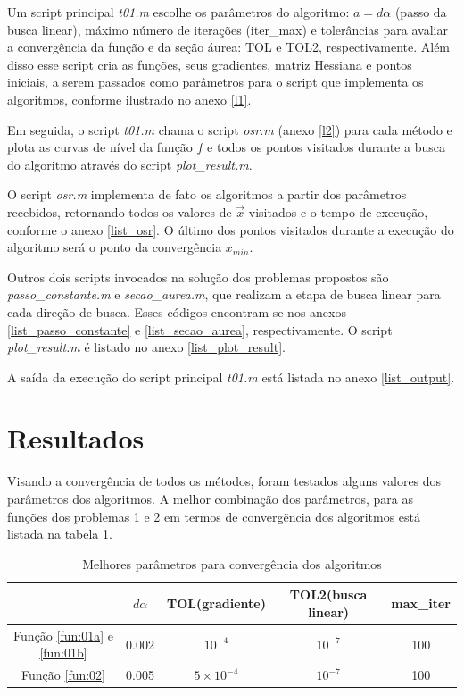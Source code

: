 \documentclass[10pt, a4paper]{article}
\begin{document}
Um script principal \textit{t01.m} escolhe os par\^ametros do algoritmo: $a=d\alpha$ (passo da busca linear), m\'aximo n\'umero de itera\c c\~oes (iter\_max) e toler\^ancias para avaliar a converg\^encia da fun\c c\~ao e da se\c c\~ao \'aurea: TOL e TOL2, respectivamente. Al\'em disso esse script cria as fun\c c\~oes, seus gradientes, matriz Hessiana e pontos iniciais, a serem passados como par\^ametros para o script que implementa os algoritmos, conforme ilustrado no anexo \ref{l1}.

Em seguida, o script \textit{t01.m} chama o script \textit{osr.m} (anexo \ref{l2}) para cada m\'etodo e plota as curvas de n\'ivel da fun\c c\~ao $f$ e todos os pontos visitados durante a busca do algoritmo atrav\'es do script \textit{plot\_result.m}.

O script \textit{osr.m} implementa de fato os algoritmos a partir dos par\^ametros recebidos, retornando todos os valores de $\vec{x}$ visitados e o tempo de execu\c c\~ao, conforme o anexo \ref{list_osr}. O \'ultimo dos pontos visitados durante a execu\c c\~ao do algoritmo ser\'a o ponto da converg\^encia $x_{min}$.

Outros dois scripts invocados na solu\c c\~ao dos problemas propostos s\~ao \textit{passo\_constante.m} e \textit{secao\_aurea.m}, que realizam a etapa de busca linear para cada dire\c c\~ao de busca. Esses c\'odigos encontram-se nos anexos \ref{list_passo_constante} e \ref{list_secao_aurea}, respectivamente. O script \textit{plot\_result.m} \'e listado no anexo \ref{list_plot_result}.

A sa\'ida da execu\c c\~ao do script principal \textit{t01.m} est\'a listada no anexo \ref{list_output}.

\section{Resultados}

Visando a converg\^encia de todos os m\'etodos, foram testados alguns valores dos par\^ametros dos algoritmos. A melhor combina\c c\~ao dos par\^ametros, para as fun\c c\~oes dos problemas 1 e 2 em termos de converg\~encia dos algoritmos est\'a listada na tabela \ref{table:params}.

\begin{table}[H]
      \small
      \centering
      \caption{Melhores par\^ametros para converg\^encia dos algoritmos}
      \begin{tabular}{c|c|c|c|c}
                        & $d\alpha$ & TOL(gradiente) & TOL2(busca linear) & max\_iter \\
            \hline
            Fun\c c\~ao \ref{fun:01a} e \ref{fun:01b} & 0.002 & $10^{-4}$ & $10^{-7}$ & 100 \\
            Fun\c c\~ao \ref{fun:02} & 0.005 & $5\times 10^{-4}$ & $10^{-7}$ & 100 \\
      \end{tabular}
      \label{table:params}
\end{table}
\end{document}
